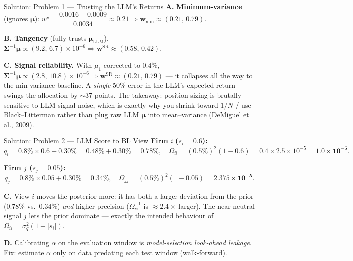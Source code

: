\documentclass[9pt,t]{beamer}
\begin{document}
\begin{frame}{Solution: Problem 1 --- Trusting the LLM's Returns}
\textbf{A. Minimum-variance} (ignores $\boldsymbol{\mu}$):
$w^\star=\dfrac{0.0016-0.0009}{0.0034}\approx 0.21\Rightarrow \mathbf{w}_{\min}\approx(0.21,\,0.79).$

\medskip
\textbf{B. Tangency} (fully trusts $\boldsymbol{\mu}_{\text{LLM}}$),
$\boldsymbol{\Sigma}^{-1}\boldsymbol{\mu}\propto(9.2,\,6.7)\!\times\!10^{-6}
\Rightarrow \mathbf{w}^{\text{SR}}\approx(0.58,\,0.42).$

\medskip
\textbf{C. Signal reliability.} With $\mu_1$ corrected to $0.4\%$,
$\boldsymbol{\Sigma}^{-1}\boldsymbol{\mu}\propto(2.8,\,10.8)\!\times\!10^{-6}
\Rightarrow \mathbf{w}^{\text{SR}}\approx(0.21,\,0.79)$ --- it collapses all the way to the
min-variance baseline. A \emph{single} 50\% error in the LLM's expected return swings the
allocation by $\sim$37 points. The takeaway: position sizing is brutally sensitive to LLM
signal noise, which is exactly why you shrink toward $1/N$ / use Black--Litterman rather than
plug raw LLM $\boldsymbol{\mu}$ into mean--variance (DeMiguel et al., 2009).
\end{frame}

\begin{frame}{Solution: Problem 2 --- LLM Score to BL View}
\textbf{Firm $i$ ($s_i=0.6$):}
\[
q_i=0.8\%\times0.6+0.30\%=0.48\%+0.30\%=\mathbf{0.78\%},
\quad
\Omega_{ii}=(0.5\%)^2(1-0.6)=0.4\times2.5\times10^{-5}=\mathbf{1.0\times10^{-5}}.
\]

\textbf{Firm $j$ ($s_j=0.05$):}
\[
q_j=0.8\%\times0.05+0.30\%=\mathbf{0.34\%},
\quad
\Omega_{jj}=(0.5\%)^2(1-0.05)=\mathbf{2.375\times10^{-5}}.
\]

\textbf{C.} View $i$ moves the posterior more: it has both a larger deviation from the
prior ($0.78\%$ vs.\ $0.34\%$) \emph{and} higher precision ($\Omega_{ii}^{-1}$ is
$\approx2.4\times$ larger). The near-neutral signal $j$ lets the prior dominate --- exactly
the intended behaviour of $\Omega_{ii}=\sigma_q^2(1-|s_i|)$.

\medskip
\textbf{D.} Calibrating $\alpha$ on the evaluation window is \emph{model-selection
look-ahead leakage}. Fix: estimate $\alpha$ only on data predating each test window
(walk-forward).
\end{frame}
\end{document}
